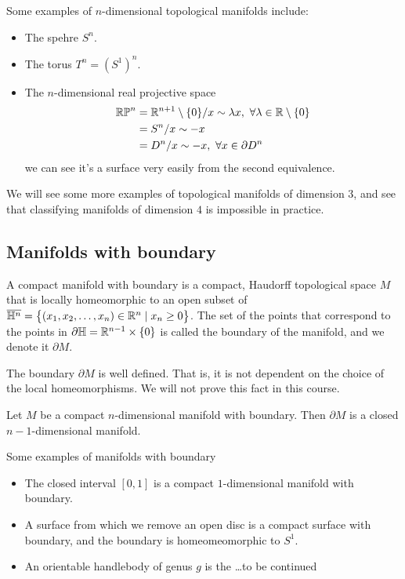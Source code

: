 \documentclass[11pt,a4paper]{article}
\begin{document}
Some examples of $n$-dimensional topological manifolds include:
\begin{itemize}
  \item The spehre $S^n$.
  \item The torus $T^n = (S^1)^n$.
  \item The $n$-dimensional real projective space
    \begin{align*}
      \RP^n &= {\R^{n+1} \setminus \set{0}}/{x \sim \lambda x},\ 
        \forall \lambda \in \R \setminus \set{0} \\
      &= {S^n}/{x \sim -x} \\
      &= {D^n}/{x \sim -x},\ \forall x \in \partial D^n
    \end{align*}
  we can see it's a surface very easily from the second equivalence.
\end{itemize}
We will see some more examples of topological manifolds of dimension
$3$, and see that classifying manifolds of dimension $4$ is impossible
in practice.

\subsection{Manifolds with boundary}
\begin{definition}
  A compact manifold with boundary is a compact, Haudorff topological 
  space $M$ that is locally homeomorphic to an open subset of
  $\overline {\mathbb H^n} = \left\{(x_1,x_2,\dots,x_n) \in 
  \mathbb{R}^n \mid x_n \geq 0\right\}$.
  The set of the points that correspond to the points in
  $\partial \mathbb H = \mathbb{R}^{n-1} \times \left\{0\right\}$ is called the boundary of
  the manifold, and we denote it $\partial M$.
\end{definition}
\begin{remark}
  The boundary $\partial M$ is well defined.
  That is, it is not dependent on the choice of the local homeomorphisms.
  We will not prove this fact in this course.
\end{remark}

\begin{proposition}
  Let $M$ be a compact $n$-dimensional manifold with boundary.
  Then $\partial M$ is a closed $n-1$-dimensional manifold.
\end{proposition}
Some examples of manifolds with boundary
\begin{itemize}
  \item The closed interval $[0,1]$ is a compact $1$-dimensional manifold
    with boundary.
  \item A surface from which we remove an open disc is a compact surface
    with boundary, and the boundary is homeomeomorphic to $S^1$.
  \item An orientable handlebody of genus $g$ is the \dots to be continued
\end{itemize}
\end{document}
